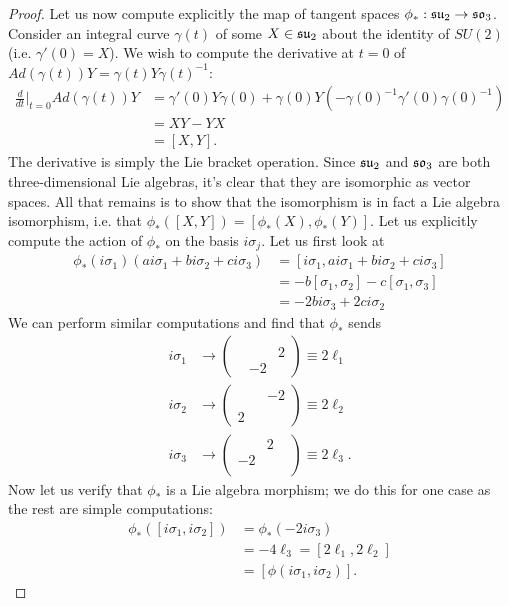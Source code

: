 \documentclass{../../mathnotes}
\begin{document}
\begin{proof}
    Let us now compute explicitly the map of tangent spaces $\phi_*:\mathfrak{su}_2\to\mathfrak{so}_3$. Consider an integral curve $\gamma(t)$ of some $X\in\mathfrak{su}_2$ about the
    identity of $SU(2)$ (i.e. $\gamma'(0)=X$). We wish to compute the derivative at $t=0$ of $Ad(\gamma(t))Y=\gamma(t)Y\gamma(t)^{-1}$:
    \begin{align*}
        \frac{d}{dt}\bigg|_{t=0}Ad(\gamma(t))Y&=\gamma'(0)Y\gamma(0)+\gamma(0)Y\left( -\gamma(0)^{-1}\gamma'(0)\gamma(0)^{-1} \right)\\
        &=XY-YX\\
        &=[X,Y].
    \end{align*}
    The derivative is simply the Lie bracket operation. Since $\mathfrak{su}_2$ and $\mathfrak{so}_3$ are both three-dimensional Lie algebras, it's clear
    that they are isomorphic as vector spaces. All that remains is to show that the isomorphism is in fact a Lie algebra isomorphism, i.e. that
    $\phi_*([X,Y])=[\phi_*(X),\phi_*(Y)]$. Let us explicitly compute the action of $\phi_*$ on the basis $i\sigma_j$.
    Let us first look at
    \begin{align*}
        \phi_*(i\sigma_1)(ai\sigma_1+bi\sigma_2+ci\sigma_3)&=[i\sigma_1,ai\sigma_1+bi\sigma_2+ci\sigma_3]\\
        &=-b[\sigma_1,\sigma_2]-c[\sigma_1,\sigma_3]\\
        &=-2bi\sigma_3+2ci\sigma_2
    \end{align*}
    We can perform similar computations and find that $\phi_*$ sends
    \begin{align*}
        i\sigma_1&\to\begin{pmatrix}&&\\&&2\\&-2&\end{pmatrix}\equiv 2\ell_1\\
        i\sigma_2&\to\begin{pmatrix}&&-2\\&&\\2&&\end{pmatrix}\equiv 2\ell_2\\
        i\sigma_3&\to\begin{pmatrix}&2&\\-2&&\\&&\end{pmatrix}\equiv 2\ell_3.
    \end{align*}
    Now let us verify that $\phi_*$ is a Lie algebra morphism; we do this for one case as the rest are simple computations:
    \begin{align*}
        \phi_*([i\sigma_1,i\sigma_2])&=\phi_*(-2i\sigma_3)\\
        &=-4\ell_3=[2\ell_1,2\ell_2]\\
        &=[\phi(i\sigma_1,i\sigma_2)].
    \end{align*}


\end{proof}
\end{document}
